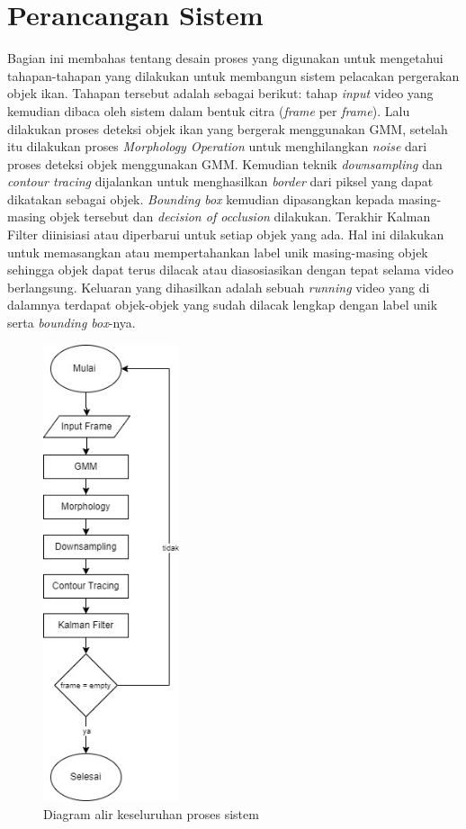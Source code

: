 \section{Perancangan Sistem}
    Bagian ini membahas tentang desain proses yang digunakan untuk mengetahui tahapan-tahapan yang dilakukan untuk membangun sistem pelacakan pergerakan objek ikan. Tahapan tersebut adalah sebagai berikut: tahap \textit{input} video yang kemudian dibaca oleh sistem dalam bentuk citra (\textit{frame} per \textit{frame}). Lalu dilakukan proses deteksi objek ikan yang bergerak menggunakan GMM, setelah itu dilakukan proses \textit{Morphology Operation} untuk menghilangkan \textit{noise} dari proses deteksi objek menggunakan GMM. Kemudian teknik \textit{downsampling} dan \textit{contour tracing} dijalankan untuk menghasilkan \textit{border} dari piksel yang dapat dikatakan sebagai objek. \textit{Bounding box} kemudian dipasangkan kepada masing-masing objek tersebut dan \textit{decision of occlusion} dilakukan. Terakhir Kalman Filter diinisiasi atau diperbarui untuk setiap objek yang ada. Hal ini dilakukan untuk memasangkan atau mempertahankan label unik masing-masing objek sehingga objek dapat terus dilacak atau diasosiasikan dengan tepat selama video berlangsung. Keluaran yang dihasilkan adalah sebuah \textit{running} video yang di dalamnya terdapat objek-objek yang sudah dilacak lengkap dengan label unik serta \textit{bounding box}-nya.
    \begin{figure}[H]
    \centering
      \singlespacing
      \captionsetup{justification=centering,margin=0.5cm}
      \includegraphics[width=4cm]{image/system-flow-chart.jpg}
      \caption{Diagram alir keseluruhan proses sistem}
      \label{fig:overalfc}
    \end{figure}
    
